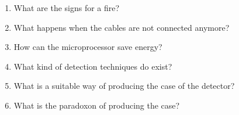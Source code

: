 \begin{enumerate}
    \item What are the signs for a fire? 
    \item What happens when the cables are not connected anymore?
    \item How can the microprocessor save energy?
    \item What kind of detection techniques do exist?
    \item What is a suitable way of producing the case of the detector?
    \item What is the paradoxon of producing the case?
\end{enumerate}
